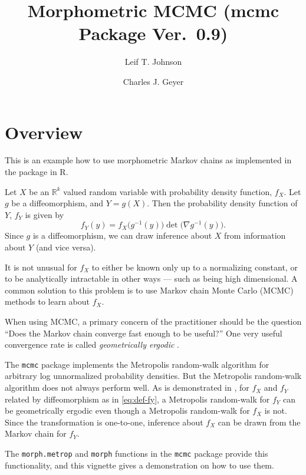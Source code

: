 \documentclass{article}
\begin{document}
\title{Morphometric MCMC (mcmc Package Ver.~0.9)}
\author{Leif T. Johnson \and Charles J. Geyer}
\maketitle

\section{Overview}

This is an example how to use morphometric Markov chains as implemented in
the \verb@mcmc@ package in R.

Let $X$ be an $\mathbb{R}^k$ valued random variable with probability density
function, $f_X$.  Let $g$ be a diffeomorphism, and $Y=g(X)$.  Then the
probability density function of $Y$, $f_Y$ is given by
\begin{equation}\label{eq:def-fy}
  f_Y(y) = f_X\bigl(g^{-1}(y)\bigr) \det\bigl( \nabla g^{-1}(y) \bigr).
\end{equation}
Since $g$ is a diffeomorphism, we can draw inference about $X$ from information
about $Y$ (and vice versa).

It is not unusual for $f_X$ to either be known only up to a normalizing
constant, or to be analytically intractable in other ways --- such as
being high dimensional.
A common solution to this problem is to use Markov chain
Monte Carlo (MCMC) methods to learn about $f_X$.

When using MCMC, a primary concern of the practitioner should be the question
``Does the Markov chain converge fast enough to be useful?''  One very useful
convergence rate is called \emph{geometrically ergodic}
\citep[Chapter~1]{johnson-thesis}.

The \texttt{mcmc} package implements the Metropolis random-walk algorithm for
arbitrary log unnormalized probability densities.  But the Metropolis
random-walk algorithm does not always perform well.  As is demonstrated in
\citet{johnson-geyer}, for $f_X$ and $f_Y$ related by diffeomorphism as in
\eqref{eq:def-fy}, a Metropolis random-walk for $f_Y$ can be geometrically
ergodic
even though a Metropolis random-walk for $f_X$ is not.
Since the transformation is
one-to-one, inference about $f_X$ can be drawn from the Markov chain for $f_Y$.

The \texttt{morph.metrop} and \texttt{morph} functions in the \texttt{mcmc}
package provide this functionality, and this vignette gives a demonstration
on how to use them.
\end{document}
